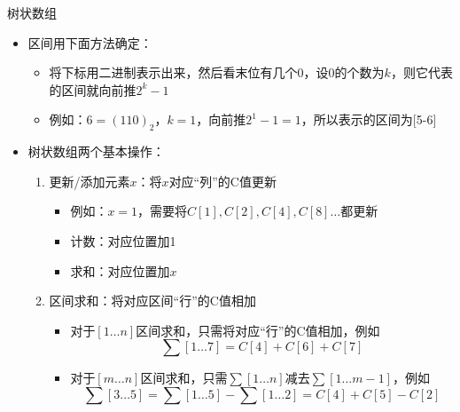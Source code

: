 \begin{frame}{树状数组}
    \begin{itemize}
        \item 区间用下面方法确定：
        \begin{itemize}
            \item 将下标用二进制表示出来，然后看末位有几个0，设0的个数为$k$，则它代表的区间就向前推$2^k-1$
            \item 例如：$6=(110)_2$，$k=1$，向前推$2^1-1=1$，所以表示的区间为[5-6]
        \end{itemize}
        \item 树状数组两个基本操作：
        \begin{enumerate}[(1)]
            \item 更新/添加元素$x$：将$x$对应“列”的C值更新
            \begin{itemize}
                \item 例如：$x=1$，需要将$C[1],C[2],C[4],C[8]\ldots$都更新
                \item 计数：对应位置加1
                \item 求和：对应位置加$x$
            \end{itemize}
            \item 区间求和：将对应区间“行”的C值相加
            \begin{itemize}
                \item 对于$[1\ldots n]$区间求和，只需将对应“行”的C值相加，例如
                $$\sum [1\ldots 7]=C[4]+C[6]+C[7]$$ 
                \item 对于$[m\ldots n]$区间求和，只需$\sum [1\ldots n]$减去$\sum [1\ldots m-1]$，例如
                $$\sum[3\ldots 5]=\sum [1…5]-\sum [1…2]=C[4]+C[5]-C[2]$$
            \end{itemize}
        \end{enumerate}
    \end{itemize}
\end{frame}
